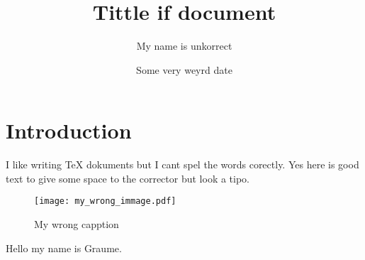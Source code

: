 \documentclass{article}
\title{Tittle if document}
\author{My name is unkorrect}
\date{Some very weyrd date}
\begin{document}
\maketitle

\section{Introduction}

I like writing TeX dokuments but I cant spel the words corectly. Yes here is good text to give some space to the corrector but look a tipo.



\begin{figure}
    \centering
    \texttt{[image: my\_wrong\_immage.pdf]} %
    \caption{My wrong capption} %
    \label{fig:my_wrong_labell} %
\end{figure}


Hello my name is Graume.
\end{document}
